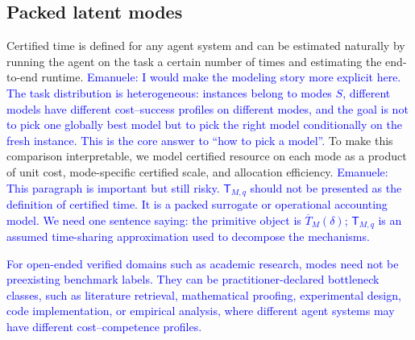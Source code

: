 \documentclass{article}
\begin{document}
\subsection{Packed latent modes}
\label{subsec:packed-latent-modes}

Certified time is defined for any agent system and can be estimated naturally by running the agent on the task a certain number of times and estimating the end-to-end runtime.
\textcolor{blue}{Emanuele: I would make the modeling story more explicit here. The task distribution is heterogeneous: instances belong to modes \(S\), different models have different cost--success profiles on different modes, and the goal is not to pick one globally best model but to pick the right model conditionally on the fresh instance. This is the core answer to ``how to pick a model''.}
To make this comparison interpretable, we model certified resource on each mode as a product of unit cost, mode-specific certified scale, and allocation efficiency.
\textcolor{blue}{Emanuele: This paragraph is important but still risky. \(\mathsf T_{M,q}\) should not be presented as the definition of certified time. It is a packed surrogate or operational accounting model. We need one sentence saying: the primitive object is \(\overline T_M(\delta)\); \(\mathsf T_{M,q}\) is an assumed time-sharing approximation used to decompose the mechanisms.}

\textcolor{blue}{For open-ended verified domains such as academic research, modes need not be preexisting benchmark labels. They can be practitioner-declared bottleneck classes, such as literature retrieval, mathematical proofing, experimental design, code implementation, or empirical analysis, where different agent systems may have different cost--competence profiles.}
\end{document}
